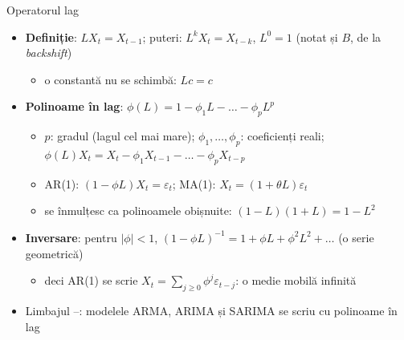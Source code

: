 \begin{frame}{Operatorul lag}
\itemsize{\small}
\begin{itemize}
    \item \textbf{Definiție}: $LX_t = X_{t-1}$; puteri: $L^kX_t = X_{t-k}$, $L^0 = 1$ (notat și $B$, de la \emph{backshift})
    \begin{itemize}
        \item o constantă nu se schimbă: $Lc = c$
    \end{itemize}
    \item \textbf{Polinoame în lag}: $\phi(L) = 1 - \phi_1L - \dots - \phi_pL^p$
    \begin{itemize}
        \item $p$: gradul (lagul cel mai mare); $\phi_1, \dots, \phi_p$: coeficienți reali; $\phi(L)X_t = X_t - \phi_1X_{t-1} - \dots - \phi_pX_{t-p}$
        \item AR(1): $(1 - \phi L)X_t = \varepsilon_t$; MA(1): $X_t = (1 + \theta L)\varepsilon_t$
        \item se înmulțesc ca polinoamele obișnuite: $(1 - L)(1 + L) = 1 - L^2$
    \end{itemize}
    \item \textbf{Inversare}: pentru $|\phi| < 1$, $(1 - \phi L)^{-1} = 1 + \phi L + \phi^2L^2 + \dots$ (o serie geometrică)
    \begin{itemize}
        \item deci AR(1) se scrie $X_t = \sum_{j \ge 0}\phi^j\varepsilon_{t-j}$: o medie mobilă infinită
    \end{itemize}
    \item Limbajul --: modelele ARMA, ARIMA și SARIMA se scriu cu polinoame în lag
\end{itemize}
\end{frame}

